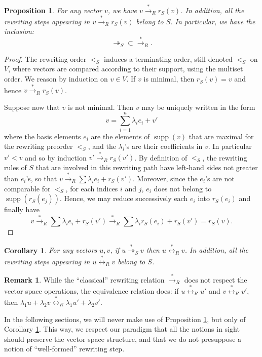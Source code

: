 \documentclass[11pt]{article}
\newtheorem{proposition}[theorem]{Proposition}
\newtheorem{corollary}[theorem]{Corollary}
\theoremstyle{definition}
\newtheorem{remark}[theorem]{Remark}
\newcommand\ordS{<_S}
\DeclareMathOperator{\supp}{supp}
\newcommand\parS{\twoheadrightarrow_S}
\newcommand\transR{\overset{*}{\to}_R}
\newcommand\transParS{\overset{*}{\twoheadrightarrow}_S}
\newcommand\equivR{\overset{*}{\leftrightarrow}_R}
\begin{document}
\begin{proposition}\label{prop:rewS_transR}
  For any vector $v$, we have $v \transR r_S(v)$.  In addition, all the rewriting steps appearing in $v \transR r_S(v)$ belong to $S$. In particular, we have the inclusion:
  \[
    \parS \subset \transR.
  \]
 
\end{proposition}
\begin{proof}
  The rewriting order $<_S$ induces a terminating order, still denoted $<_S$ on
  $V$, where vectors are compared according to their support, using the multiset
  order. We reason by induction on $v \in V$. If $v$ is minimal, then
  $r_S(v) = v$ and hence $v \transR r_S(v)$.

  Suppose now that $v$ is not minimal. Then $v$ may be uniquely written in the form
  \begin{equation}\label{equ:decompo_max}
    v=\sum_{i=1}^n\lambda_ie_i+v'
  \end{equation}
  where the basis elements $e_i$ are the elements of $\supp(v)$ that are maximal
  for the rewriting preorder $\ordS$, and the $\lambda_i$'s are their coefficients in
  $v$. In particular $v' < v$ and so by induction $v' \transR r_S(v')$.  By
  definition of $<_S$, the rewriting rules of $S$ that are involved in this
  rewriting path have left-hand sides not greater than $e_i$'s, so that
  $v\transR \sum\lambda_ie_i+r_S(v')$. Moreover, since the $e_i$'s are not comparable for
  $\ordS$, for each indices $i$ and $j$, $e_i$ does not belong to
  $\supp(r_S(e_j))$. Hence, we may reduce successively each $e_i$ into
  $r_S(e_i)$ and finally have
  \[
    v \transR
    \sum \lambda_ie_i+r_S(v') \transR
    \sum\lambda_ir_S(e_i) + r_S(v')
    =r_S(v).\]
\end{proof}

\begin{corollary}\label{cor:transS_equivR}
  For any vectors $u,v$, if $u \transParS v$ then $ u \equivR v$.  In addition,
  all the rewriting steps appearing in $u \equivR v$ belong to $S$.
\end{corollary}

\begin{remark}
  While the ``classical'' rewriting relation $\transR$ does not respect the
  vector space operations, the equivalence relation does: if $u \equivR u'$ and
  $v \equivR v'$, then $\lambda_1 u + \lambda_2 v \equivR \lambda_1 u' + \lambda_2 v'$.

  In the following sections, we will never make use of Proposition
  \ref{prop:rewS_transR}, but only of Corollary \ref{cor:transS_equivR}. This way,
  we respect our paradigm that all the notions in sight should preserve the
  vector space structure, and that we do not presuppose a notion of
  ``well-formed'' rewriting step.
\end{remark}
\end{document}
